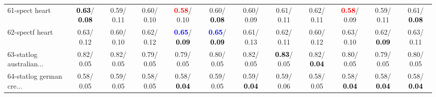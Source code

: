 \begin{table}[h]
\begin{center}
{\begin{tabular}{lc|c|c|c|c|c|c|c|c|c|c}
61-spect heart & \textcolor{black}{\textbf{  0.63}}/\textcolor{black}{\textbf{  0.08}} &   0.59/  0.11 &   0.60/  0.10 & \textcolor{red}{\textbf{  0.58}}/  0.10 &   0.60/\textcolor{black}{\textbf{  0.08}} &   0.60/  0.09 &   0.61/  0.11 &   0.62/  0.11 & \textcolor{red}{\textbf{  0.58}}/  0.09 &   0.59/  0.11 &   0.61/\textcolor{black}{\textbf{  0.08}} \\
62-spectf heart &   0.63/  0.12 &   0.60/  0.10 &   0.62/  0.12 & \textcolor{blue}{\textbf{  0.65}}/\textcolor{black}{\textbf{  0.09}} & \textcolor{blue}{\textbf{  0.65}}/\textcolor{black}{\textbf{  0.09}} &   0.61/  0.13 &   0.62/  0.11 &   0.60/  0.12 &   0.63/  0.10 &   0.62/\textcolor{black}{\textbf{  0.09}} &   0.63/  0.11 \\
63-statlog australian... &   0.82/  0.05 &   0.82/  0.05 &   0.79/  0.05 &   0.79/  0.05 &   0.80/  0.05 &   0.82/  0.05 & \textcolor{black}{\textbf{  0.83}}/  0.05 &   0.82/\textcolor{black}{\textbf{  0.04}} &   0.80/  0.05 &   0.79/  0.05 &   0.80/  0.05 \\
64-statlog german cre... &   0.58/  0.05 &   0.59/  0.05 &   0.58/  0.05 &   0.58/\textcolor{black}{\textbf{  0.04}} &   0.59/  0.05 &   0.59/\textcolor{black}{\textbf{  0.04}} &   0.59/  0.06 &   0.58/  0.05 &   0.58/\textcolor{black}{\textbf{  0.04}} &   0.58/\textcolor{black}{\textbf{  0.04}} &   0.58/\textcolor{black}{\textbf{  0.04}} \\\end{tabular}}\label{stratsBalAcc1bCIELM}
\end{center}
\end{table}
